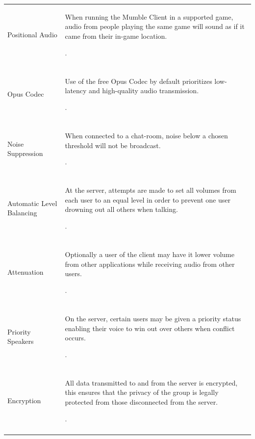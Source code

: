 \documentclass[twoside, titlepage]{article}
\begin{document}
\begin{tabular}[t]{ll}
		Positional Audio & \begin{minipage}{0.5\textwidth}
			When running the Mumble Client in a supported
			game, audio from people playing the same game will
			sound as if it came from their in-game location.
		\end{minipage}. \\\\
		\rowcolor{gray}
		Opus Codec & \begin{minipage}{0.5\textwidth}
			Use of the free Opus Codec by default prioritizes
			low-latency and high-quality audio transmission.
		\end{minipage}. \\\\
		Noise Suppression & \begin{minipage}{0.5\textwidth}
			When connected to a chat-room, noise below a
			chosen threshold will not be broadcast.
		\end{minipage}. \\\\
		\rowcolor{gray}
		Automatic Level Balancing & \begin{minipage}{0.5\textwidth}
			At the server, attempts are made to set all volumes
			from each user to an equal level in order to
			prevent one user drowning out all others when
			talking.
		\end{minipage}. \\\\
		Attenuation & \begin{minipage}{0.5\textwidth}
			Optionally a user of the client may have it lower
			volume from other applications while receiving
			audio from other users.
		\end{minipage}. \\\\
		\rowcolor{gray}
		Priority Speakers & \begin{minipage}{0.5\textwidth}
			On the server, certain users may be given a
			priority status enabling their voice to win out
			over others when conflict occurs.
		\end{minipage}. \\\\
		Encryption & \begin{minipage}{0.5\textwidth}
			All data transmitted to and from the server
			is encrypted, this ensures that the privacy of the
			group is legally protected from those disconnected
			from the server.
		\end{minipage}. \\\\

\end{tabular}
\end{document}

